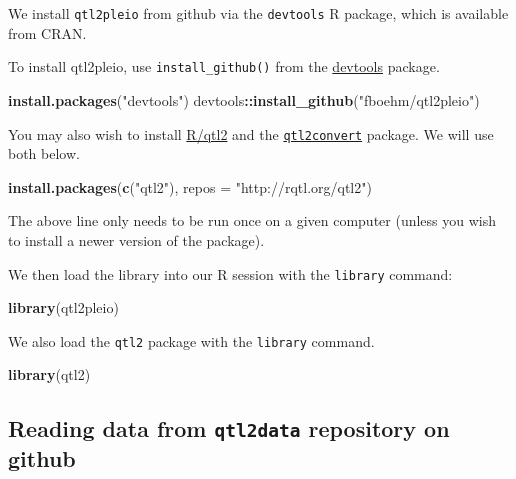\documentclass[oneside]{book}\usepackage[]{graphicx}\usepackage[]{color}
\newenvironment{Shaded}{\begin{snugshade}}{\end{snugshade}}
\newcommand{\DataTypeTok}[1]{\textcolor[rgb]{0.13,0.29,0.53}{#1}}
\newcommand{\KeywordTok}[1]{\textcolor[rgb]{0.13,0.29,0.53}{\textbf{#1}}}
\newcommand{\NormalTok}[1]{#1}
\newcommand{\OperatorTok}[1]{\textcolor[rgb]{0.81,0.36,0.00}{\textbf{#1}}}
\newcommand{\StringTok}[1]{\textcolor[rgb]{0.31,0.60,0.02}{#1}}
\begin{document}
We install \texttt{qtl2pleio} from github via the \texttt{devtools} R
package, which is available from CRAN.

To install qtl2pleio, use \texttt{install\_github()} from the
\href{https://devtools.r-lib.org}{devtools} package.

\begin{Shaded}
\begin{Highlighting}[]
\KeywordTok{install.packages}\NormalTok{(}\StringTok{"devtools"}\NormalTok{)}
\NormalTok{devtools}\OperatorTok{::}\KeywordTok{install_github}\NormalTok{(}\StringTok{"fboehm/qtl2pleio"}\NormalTok{)}
\end{Highlighting}
\end{Shaded}

You may also wish to install \href{https://kbroman.org/qtl2}{R/qtl2} and
the \href{https://github.com/rqtl/qtl2convert}{\texttt{qtl2convert}}
package. We will use both below.

\begin{Shaded}
\begin{Highlighting}[]
\KeywordTok{install.packages}\NormalTok{(}\KeywordTok{c}\NormalTok{(}\StringTok{"qtl2"}\NormalTok{), }\DataTypeTok{repos =} \StringTok{"http://rqtl.org/qtl2"}\NormalTok{)}
\end{Highlighting}
\end{Shaded}

The above line only needs to be run once on a given computer (unless you
wish to install a newer version of the package).

We then load the library into our R session with the \texttt{library}
command:

\begin{Shaded}
\begin{Highlighting}[]
\KeywordTok{library}\NormalTok{(qtl2pleio)}
\end{Highlighting}
\end{Shaded}

We also load the \texttt{qtl2} package with the \texttt{library}
command.

\begin{Shaded}
\begin{Highlighting}[]
\KeywordTok{library}\NormalTok{(qtl2)}
\end{Highlighting}
\end{Shaded}

\hypertarget{reading-data-from-qtl2data-repository-on-github}{%
\subsection{\texorpdfstring{Reading data from \texttt{qtl2data}
repository on
github}{Reading data from qtl2data repository on github}}\label{reading-data-from-qtl2data-repository-on-github}}
\end{document}
